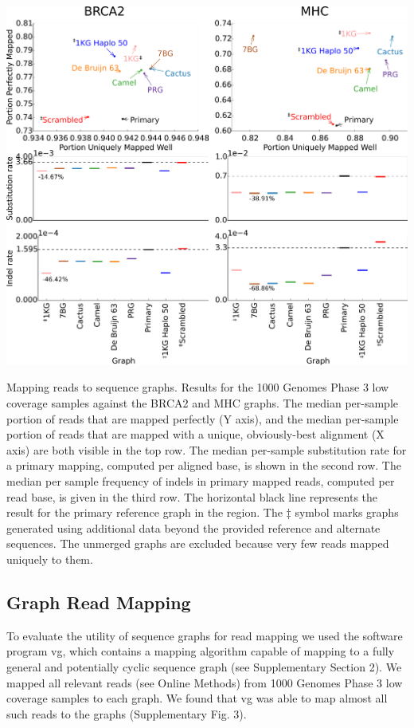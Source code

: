 \begin{FPfigure}
\centering
\includegraphics[width=\textwidth]{figures/04_bakeoff/figure02.png}
\caption[Mapping reads to sequence graphs]{Mapping reads to sequence graphs. Results for the 1000 Genomes
Phase 3 low coverage samples against the BRCA2 and MHC graphs. The
median per-sample portion of reads that are mapped perfectly (Y axis),
and the median per-sample portion of reads that are mapped with a
unique, obviously-best alignment (X axis) are both visible in the top
row. The median per-sample substitution rate for a primary mapping,
computed per aligned base, is shown in the second row. The median per
sample frequency of indels in primary mapped reads, computed per read
base, is given in the third row. The horizontal black line represents
the result for the primary reference graph in the region. The ‡ symbol
marks graphs generated using additional data beyond the provided
reference and alternate sequences. The unmerged graphs are excluded
because very few reads mapped uniquely to them.}
\label{fig:bakeoff:mapping}
\end{FPfigure}

\subsection{Graph Read Mapping}

To evaluate the utility of sequence graphs for read mapping we used the
software program vg\cite{Vgteam_undated-xe}, which contains a mapping
algorithm capable of mapping to a fully general and potentially cyclic
sequence graph (see Supplementary Section 2). We mapped all relevant
reads (see Online Methods) from 1000 Genomes Phase 3 low coverage
samples to each graph. We found that vg was able to map almost all such
reads to the graphs (Supplementary Fig. 3).

